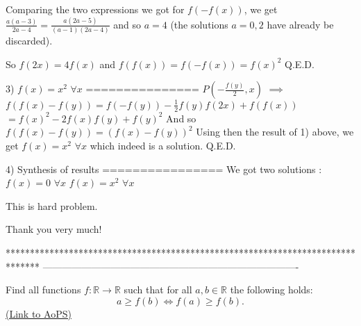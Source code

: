 \begin{solution}
Comparing the two expressions we got for $f(-f(x))$, we get $\frac{a(a-3)}{2a-4}=\frac{a(2a-5)}{(a-1)(2a-4)}$ and so $a=4$ (the solutions $a=0,2$ have already be discarded).

So $f(2x)=4f(x)$ and $f(f(x))=f(-f(x))=f(x)^2$ 
Q.E.D.

3) $f(x)=x^2$ $\forall x$
===============
$P(-\frac{f(y)}2,x)$ $\implies$ $f(f(x)-f(y))=f(-f(y))-\frac 12f(y)f(2x)+f(f(x))$ $=f(x)^2-2f(x)f(y)+f(y)^2$
And so $f(f(x)-f(y))=(f(x)-f(y))^2$
Using then the result of 1) above, we get $f(x)=x^2$ $\forall x$ which indeed is a solution.
Q.E.D.

4) Synthesis of results
================
We got two solutions :
$f(x)=0$ $\forall x$
$f(x)=x^2$ $\forall x$
\end{solution}



\begin{solution}
	This is hard problem.

Thank you very much!
\end{solution}
*******************************************************************************
-------------------------------------------------------------------------------

\begin{problem}
	Find all functions $f:\mathbb{R}\to\mathbb{R}$ such that for all $a,b\in\mathbb{R}$ the following holds: \[a\geq f(b) \iff  f(a)\geq f(b).\]
	\flushright \href{https://artofproblemsolving.com/community/c6h392074}{(Link to AoPS)}
\end{problem}




